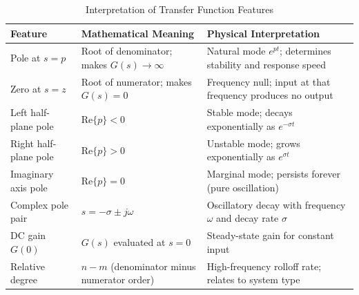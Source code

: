 \begin{table}[h!]
\centering
\color{UofSCBlack}
\caption{Interpretation of Transfer Function Features}
\color{UofSCBlack}
\begin{tabular}{|p{2.0cm}|p{3.5cm}|p{3.5cm}|}
\hline
\color{UofSCGarnet}
\textbf{Feature} & \color{UofSCGarnet}
\textbf{Mathematical Meaning} & \color{UofSCGarnet}
\textbf{Physical Interpretation} \\
\hline
\color{UofSCBlack}
Pole at $s = p$ & Root of denominator; makes $G(s) \to \infty$ & Natural mode $e^{pt}$; determines stability and response speed \\
\hline
\color{UofSCBlack}
Zero at $s = z$ & Root of numerator; makes $G(s) = 0$ & Frequency null; input at that frequency produces no output \\
\hline
\color{UofSCBlack}
Left half-plane pole & $\text{Re}\{p\} < 0$ & Stable mode; decays exponentially as $e^{-\sigma t}$ \\
\hline
\color{UofSCBlack}
Right half-plane pole & $\text{Re}\{p\} > 0$ & Unstable mode; grows exponentially as $e^{\sigma t}$ \\
\hline
\color{UofSCBlack}
Imaginary axis pole & $\text{Re}\{p\} = 0$ & Marginal mode; persists forever (pure oscillation) \\
\hline
\color{UofSCBlack}
Complex pole pair & $s = -\sigma \pm j\omega$ & Oscillatory decay with frequency $\omega$ and decay rate $\sigma$ \\
\hline
\color{UofSCBlack}
DC gain $G(0)$ & $G(s)$ evaluated at $s = 0$ & Steady-state gain for constant input \\
\hline
\color{UofSCBlack}
Relative degree & $n - m$ (denominator minus numerator order) & High-frequency rolloff rate; relates to system type \\
\hline
\end{tabular}
\end{table}
